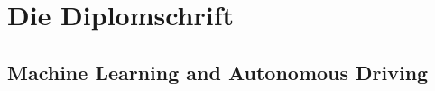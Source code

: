 \chapter{Die Diplomschrift}
\label{cha:Diplomschrift}



\section{Machine Learning and Autonomous Driving}

%
